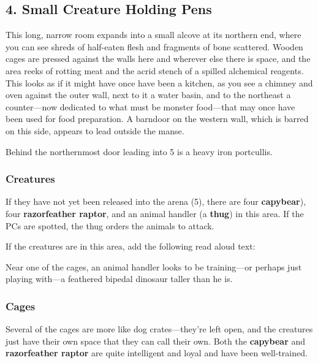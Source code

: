 \documentclass[10pt,a4paper,twoside,bg=print,twocolumn,openany,nodeprecatedcode]{dndbook}
\begin{document}
\subsection{4. Small Creature Holding Pens}
\begin{DndReadAloud}{}
This long, narrow room expands into a small alcove at its northern end, where you can see shreds of half-eaten flesh and fragments of bone scattered. Wooden cages are pressed against the walls here and wherever else there is space, and the area reeks of rotting meat and the acrid stench of a spilled alchemical reagents. This looks as if it might have once have been a kitchen, as you see a chimney and oven against the outer wall, next to it a water basin, and to the northeast a counter—now dedicated to what must be monster food—that may once have been used for food preparation. A barndoor on the western wall, which is barred on this side, appears to lead outside the manse.

\end{DndReadAloud}

Behind the northernmost door leading into 5 is a heavy iron portcullis.

\subsubsection{Creatures}
If they have not yet been released into the arena (5), there are four \textbf{capybear}), four \textbf{razorfeather raptor}, and an animal handler (a \textbf{thug}) in this area. If the PCs are spotted, the thug orders the animals to attack.

If the creatures are in this area, add the following read aloud text:

\begin{DndReadAloud}{}
Near one of the cages, an animal handler looks to be training—or perhaps just playing with—a feathered bipedal dinosaur taller than he is.

\end{DndReadAloud}

\subsubsection{Cages}
Several of the cages are more like dog crates—they're left open, and the creatures just have their own space that they can call their own. Both the \textbf{capybear} and \textbf{razorfeather raptor} are quite intelligent and loyal and have been well-trained.
\end{document}
